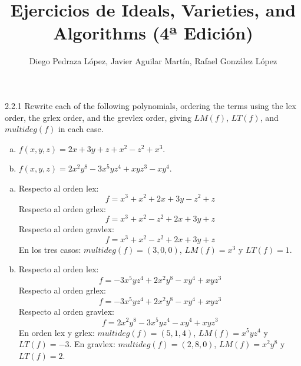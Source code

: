 \documentclass[twoside]{article}
\begin{document}
\title{Ejercicios de Ideals, Varieties, and Algorithms (4ª Edición)}
\author{Diego Pedraza López, Javier Aguilar Martín, Rafael González López}
\maketitle

\begin{ejercicio}{2.2.1}
Rewrite each of the following polynomials, ordering the terms using the lex order, the grlex order, and the grevlex order, giving $LM(f)$, $LT(f)$, and $multideg(f)$ in each case.
\begin{enumerate}[a.]
\item $f(x,y,z) = 2x + 3y + z + x^2- z^2 + x^3$.
\item $f(x,y,z) = 2x^2y^8 - 3x^5yz^4 + xyz^3 - xy^4$.
\end{enumerate}
\end{ejercicio}
\begin{solucion}\mbox{}
\begin{enumerate}[a.]
\item Respecto al orden lex:
 \[ f = x^3 + x^2 + 2x + 3y - z^2 + z \]
 Respecto al orden grlex:
 \[ f = x^3 + x^2 - z^2 + 2x + 3y + z \]
 Respecto al orden gravlex:
 \[ f = x^3 + x^2 - z^2 + 2x + 3y + z \]
 En los tres casos: $multideg(f)=(3,0,0)$, $LM(f)=x^3$ y $LT(f)=1$.
\item Respecto al orden lex:
 \[ f = -3x^5yz^4 + 2x^2y^8 - xy^4 + xyz^3 \]
 Respecto al orden grlex:
 \[ f = -3x^5yz^4 + 2x^2y^8 - xy^4 + xyz^3 \]
 Respecto al orden gravlex:
 \[ f = 2x^2y^8 -3x^5yz^4 - xy^4 + xyz^3\]
 En orden lex y grlex: $multideg(f)=(5,1,4)$, $LM(f)=x^5yz^4$ y $LT(f)=-3$. En gravlex: $multideg(f)=(2,8,0)$, $LM(f)=x^2y^8$ y $LT(f)=2$.
\end{enumerate}
\end{solucion}

\newpage
\end{document}
